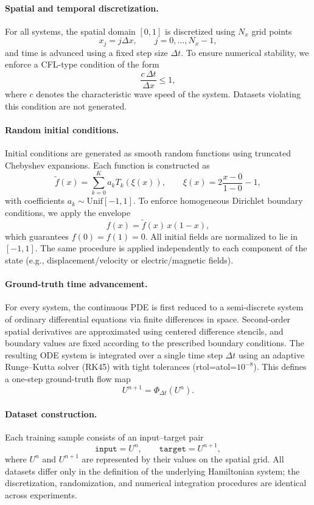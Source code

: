 \documentclass{article}
\theoremstyle{plain}
\theoremstyle{definition}
\theoremstyle{remark}
\begin{document}
\paragraph{Spatial and temporal discretization.}
For all systems, the spatial domain $[0,1]$ is discretized using $N_x$ grid points
\[
x_j = j\Delta x,\qquad j=0,\dots,N_x-1,
\]
and time is advanced using a fixed step size $\Delta t$.
To ensure numerical stability, we enforce a CFL-type condition of the form
\begin{equation}
\frac{c\,\Delta t}{\Delta x}\le 1,
\end{equation}
where $c$ denotes the characteristic wave speed of the system.
Datasets violating this condition are not generated.

\paragraph{Random initial conditions.}
Initial conditions are generated as smooth random functions using truncated
Chebyshev expansions.
Each function is constructed as
\[
\tilde f(x)=\sum_{k=0}^{K} a_k T_k(\xi(x)),
\qquad
\xi(x)=2\frac{x-0}{1-0}-1,
\]
with coefficients $a_k\sim\mathrm{Unif}[-1,1]$.
To enforce homogeneous Dirichlet boundary conditions, we apply the envelope
\begin{equation}
f(x)=\tilde f(x)\,x(1-x),
\end{equation}
which guarantees $f(0)=f(1)=0$.
All initial fields are normalized to lie in $[-1,1]$.
The same procedure is applied independently to each component of the state
(e.g., displacement/velocity or electric/magnetic fields).

\paragraph{Ground-truth time advancement.}
For every system, the continuous PDE is first reduced to a semi-discrete system
of ordinary differential equations via finite differences in space.
Second-order spatial derivatives are approximated using centered difference stencils,
and boundary values are fixed according to the prescribed boundary conditions.
The resulting ODE system is integrated over a single time step $\Delta t$ using
an adaptive Runge--Kutta solver (RK45) with tight tolerances
(rtol=atol=$10^{-8}$).
This defines a one-step ground-truth flow map
\[
U^{n+1}=\Phi_{\Delta t}(U^n).
\]

\paragraph{Dataset construction.}
Each training sample consists of an input--target pair
\[
\texttt{input} = U^n,\qquad
\texttt{target} = U^{n+1},
\]
where $U^n$ and $U^{n+1}$ are represented by their values on the spatial grid.
All datasets differ only in the definition of the underlying Hamiltonian system;
the discretization, randomization, and numerical integration procedures are
identical across experiments.
\end{document}

